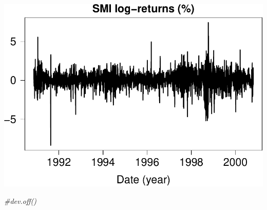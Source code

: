 \documentclass[
]{article}
\newenvironment{Shaded}{\begin{snugshade}}{\end{snugshade}}
\newcommand{\CommentTok}[1]{\textcolor[rgb]{0.56,0.35,0.01}{\textit{#1}}}
\begin{document}
\includegraphics{MS-GARCH_files/figure-latex/unnamed-chunk-9-1.pdf}

\begin{Shaded}
\begin{Highlighting}[]
\CommentTok{\#dev.off()}
\end{Highlighting}
\end{Shaded}
\end{document}
